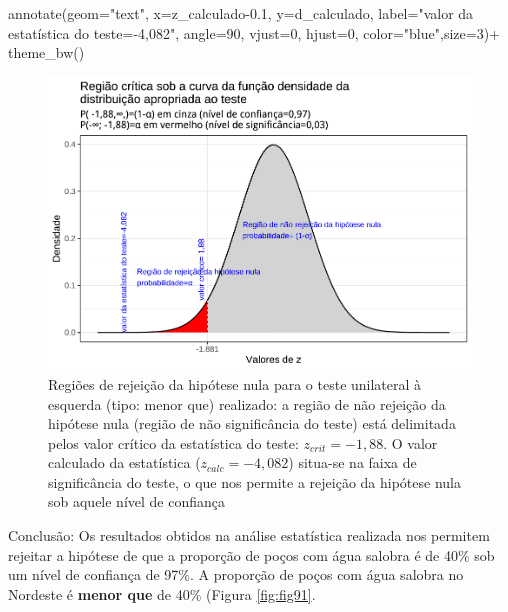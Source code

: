 \documentclass[
]{book}
\newenvironment{Shaded}{\begin{snugshade}}{\end{snugshade}}
\newcommand{\AttributeTok}[1]{\textcolor[rgb]{0.77,0.63,0.00}{#1}}
\newcommand{\DecValTok}[1]{\textcolor[rgb]{0.00,0.00,0.81}{#1}}
\newcommand{\FloatTok}[1]{\textcolor[rgb]{0.00,0.00,0.81}{#1}}
\newcommand{\FunctionTok}[1]{\textcolor[rgb]{0.00,0.00,0.00}{#1}}
\newcommand{\NormalTok}[1]{#1}
\newcommand{\SpecialCharTok}[1]{\textcolor[rgb]{0.00,0.00,0.00}{#1}}
\newcommand{\StringTok}[1]{\textcolor[rgb]{0.31,0.60,0.02}{#1}}
\begin{document}
\begin{Shaded}
\begin{Highlighting}[]
  \FunctionTok{annotate}\NormalTok{(}\AttributeTok{geom=}\StringTok{"text"}\NormalTok{, }\AttributeTok{x=}\NormalTok{z\_calculado}\FloatTok{{-}0.1}\NormalTok{, }\AttributeTok{y=}\NormalTok{d\_calculado, }\AttributeTok{label=}\StringTok{"valor da estatística do teste={-}4,082"}\NormalTok{, }\AttributeTok{angle=}\DecValTok{90}\NormalTok{, }\AttributeTok{vjust=}\DecValTok{0}\NormalTok{, }\AttributeTok{hjust=}\DecValTok{0}\NormalTok{, }\AttributeTok{color=}\StringTok{"blue"}\NormalTok{,}\AttributeTok{size=}\DecValTok{3}\NormalTok{)}\SpecialCharTok{+}
  \FunctionTok{theme\_bw}\NormalTok{()}
\end{Highlighting}
\end{Shaded}

\begin{figure}

{\centering \includegraphics[width=1\linewidth]{apostila_files/figure-latex/fig93-1} 

}

\caption{Regiões de rejeição da hipótese nula para o teste unilateral à esquerda (tipo: menor que) realizado: a região de não rejeição da hipótese nula (região de não significância do teste) está delimitada pelos valor crítico da estatística do teste: $z_{crit} = -1,88$. O valor calculado da estatística ($z_{calc}=-4,082$) situa-se na faixa de significância do teste, o que nos permite a rejeição da hipótese nula sob aquele nível de confiança}\label{fig:fig93}
\end{figure}

\hfill\break

Conclusão: Os resultados obtidos na análise estatística realizada nos permitem rejeitar a hipótese de que a proporção de poços com água salobra é de 40\% sob um nível de confiança de 97\%. A proporção de poços com água salobra no Nordeste é \textbf{menor que} de 40\% (Figura \ref{fig:fig91}.
\end{document}
